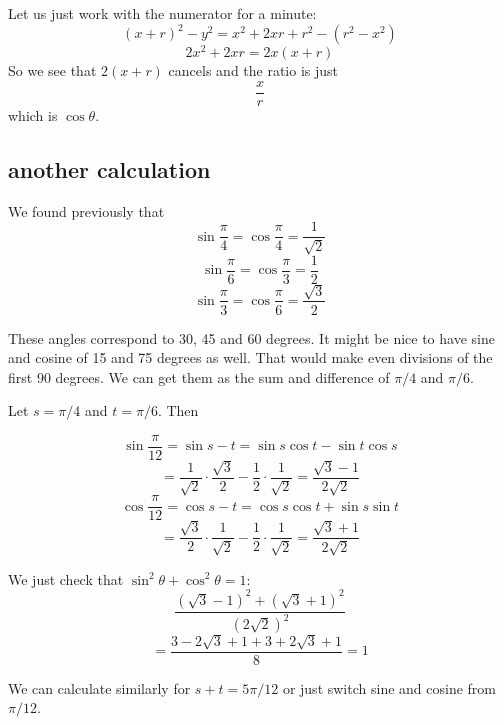 \documentclass[11pt, oneside]{article}
\begin{document}
Let us just work with the numerator for a minute:
\[ (x+r)^2 - y^2 = x^2 + 2xr + r^2 - (r^2 - x^2) \]
\[ 2x^2 + 2xr = 2x(x + r) \]
So we see that $2(x+r)$ cancels and the ratio is just
\[ \frac{x}{r} \]
which is $\cos \theta$.

\subsection*{another calculation}
We found previously that 
\[ \sin \frac{\pi}{4} = \cos \frac{\pi}{4} = \frac{1}{\sqrt{2}} \]
\[ \sin \frac{\pi}{6} = \cos \frac{\pi}{3} = \frac{1}{2} \]
\[ \sin \frac{\pi}{3} = \cos \frac{\pi}{6} = \frac{\sqrt{3}}{2} \]

These angles correspond to 30, 45 and 60 degrees.  It might be nice to have sine and cosine of 15 and 75 degrees as well.  That would make even divisions of the first 90 degrees.  We can get them as the sum and difference of $\pi/4$ and $\pi/6$.

Let $s = \pi/4$ and $t = \pi/6$.  Then

\[ \sin \frac{\pi}{12} = \sin s - t = \sin s \cos t - \sin t \cos s \]
\[ = \frac{1}{\sqrt{2}} \cdot \frac{\sqrt{3}}{2} - \frac{1}{2} \cdot \frac{1}{\sqrt{2}} = \frac{\sqrt{3} - 1}{2 \sqrt{2}} \]
\[ \cos \frac{\pi}{12} = \cos s - t = \cos s \cos t + \sin s \sin t \]
\[ = \frac{\sqrt{3}}{2} \cdot \frac{1}{\sqrt{2}} - \frac{1}{2} \cdot \frac{1}{\sqrt{2}} = \frac{\sqrt{3} + 1}{2 \sqrt{2}} \]

We just check that $\sin^2 \theta + \cos^2 \theta = 1$:
\[ \frac{(\sqrt{3} - 1)^2 + (\sqrt{3} + 1)^2}{(2 \sqrt{2})^2} \]
\[ = \frac{3 - 2 \sqrt{3} + 1 + 3 + 2 \sqrt{3} + 1}{8} = 1 \]

We can calculate similarly for $s + t = 5 \pi/12$ or just switch sine and cosine from $\pi/12$.
\end{document}
